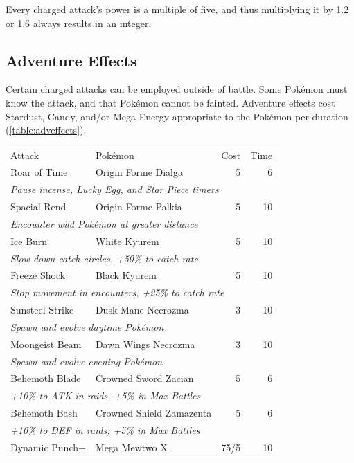 \begin{tipbox}[title=Did you notice?]
Every charged attack's power is a multiple of five, and thus multiplying it by 1.2 or 1.6 always results in an integer.
\end{tipbox}

\subsection{Adventure Effects\label{sec:effects}}
Certain charged attacks can be employed outside of battle.
Some Pokémon must know the attack, and that Pokémon cannot be fainted.
Adventure effects cost Stardust, Candy, and/or Mega Energy appropriate to the Pokémon
  per duration (\autoref{table:adveffects}).
\begin{table}
\centering
\footnotesize
\begin{tabular}{llrr}
Attack & Pokémon & Cost & Time\\
\Midrule
Roar of Time & Origin Forme Dialga & 5 & 6\\
  \multicolumn{4}{l}{\textit{Pause incense, Lucky Egg, and Star Piece timers}}\\
Spacial Rend & Origin Forme Palkia & 5 & 10\\
  \multicolumn{4}{l}{\textit{Encounter wild Pokémon at greater distance}}\\
Ice Burn & White Kyurem & 5 & 10\\
  \multicolumn{4}{l}{\textit{Slow down catch circles, +50\% to catch rate}}\\
Freeze Shock & Black Kyurem & 5 & 10\\
  \multicolumn{4}{l}{\textit{Stop movement in encounters, +25\% to catch rate}}\\
Sunsteel Strike & Dusk Mane Necrozma & 3 & 10\\
  \multicolumn{4}{l}{\textit{Spawn and evolve daytime Pokémon}}\\
Moongeist Beam & Dawn Wings Necrozma & 3 & 10\\
  \multicolumn{4}{l}{\textit{Spawn and evolve evening Pokémon}}\\
Behemoth Blade & Crowned Sword Zacian & 5 & 6\\
  \multicolumn{4}{l}{\textit{+10\% to ATK in raids, +5\% in Max Battles}}\\
Behemoth Bash & Crowned Shield Zamazenta & 5 & 6\\
  \multicolumn{4}{l}{\textit{+10\% to DEF in raids, +5\% in Max Battles}}\\
Dynamic Punch+ & Mega Mewtwo X & 75/5 & 10 \\

\end{tabular}
\end{table}
